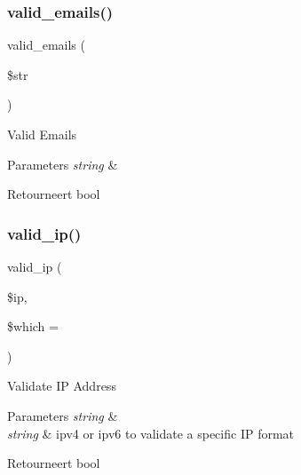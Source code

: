 \subsubsection{\texorpdfstring{valid\_emails()}{valid\_emails()}}
{\footnotesize\ttfamily valid\+\_\+emails (\begin{DoxyParamCaption}\item[{}]{\$str }\end{DoxyParamCaption})}

Valid Emails


\begin{DoxyParams}{Parameters}
{\em string} & \\
\hline
\end{DoxyParams}
\begin{DoxyReturn}{Retourneert}
bool 
\end{DoxyReturn}
\mbox{\label{class_c_i___form__validation_a10da42e1fde6cd5b335efcd2338c4ff8}} 
\subsubsection{\texorpdfstring{valid\_ip()}{valid\_ip()}}
{\footnotesize\ttfamily valid\+\_\+ip (\begin{DoxyParamCaption}\item[{}]{\$ip,  }\item[{}]{\$which = {\ttfamily \textquotesingle{}\textquotesingle{}} }\end{DoxyParamCaption})}

Validate IP Address


\begin{DoxyParams}{Parameters}
{\em string} & \\
\hline
{\em string} & \textquotesingle{}ipv4\textquotesingle{} or \textquotesingle{}ipv6\textquotesingle{} to validate a specific IP format \\
\hline
\end{DoxyParams}
\begin{DoxyReturn}{Retourneert}
bool 
\end{DoxyReturn}
\mbox{\label{class_c_i___form__validation_a2879cd05a763105684cbad690e5cffd3}} 
